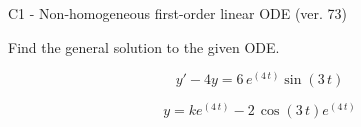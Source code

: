 \begin{exercise}
  \begin{exerciseTitle}C1 - Non-homogeneous first-order linear ODE (ver. 73)\end{exerciseTitle}
  \begin{exerciseStatement}
    
Find the general solution to the given ODE.

    
\[y'-4y= 6 \, e^{\left(4 \, t\right)} \sin\left(3 \, t\right)\]

  \end{exerciseStatement}
  \begin{exerciseAnswer}
    
\[y= k e^{\left(4 \, t\right)} - 2 \, \cos\left(3 \, t\right) e^{\left(4 \, t\right)}\]

  \end{exerciseAnswer}
\end{exercise}
